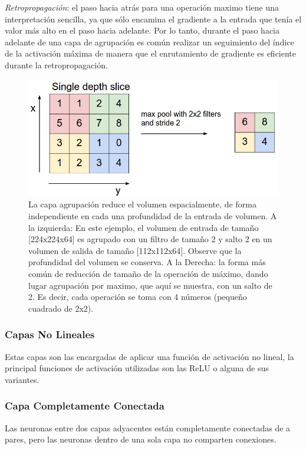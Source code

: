 \documentclass[a4paper,11pt,spanish]{book}
\begin{document}
	\emph{Retropropagación}: el paso hacia atrás para una operación maximo tiene una interpretación sencilla, ya que sólo encamina el gradiente a la entrada que tenía el valor más alto
	en el paso hacia adelante. Por lo tanto, durante el paso hacia adelante de una capa de agrupación es común realizar un seguimiento del índice de la activación máxima de
	manera que el enrutamiento de gradiente es eficiente durante la retropropagación.

	\begin{figure}[H]
	  \begin{center}
	   \includegraphics[width=0.8\linewidth]{./img/stanford_maxpool.jpeg}
	  \end{center}
	  \caption{La capa agrupación reduce el volumen espacialmente, de forma independiente en cada una profundidad de la entrada de volumen.
	    A la izquierda: En este ejemplo, el volumen de entrada de tamaño [224x224x64] es agrupado con un filtro de tamaño 2 y salto 2 en un volumen de salida de tamaño [112x112x64].
	    Observe que la profundidad del volumen se conserva. A la Derecha: la forma más común de reducción de tamaño de la operación de máximo, dando lugar agrupación por maximo,
	    que aquí se muestra, con un salto de 2. Es decir, cada operación se toma con 4 números (pequeño cuadrado de 2x2). \cite{Stanford}}
	  \label{fig:maxpool_layer}
	\end{figure}

      \subsubsection{Capas No Lineales}
	Estas capas son las encargadas de aplicar una función de activación no lineal, la principal funciones de activación utilizadas son las ReLU o alguna de sus variantes.

      \subsubsection{Capa Completamente Conectada}
	Las neuronas entre dos capas adyacentes están completamente conectadas de a pares, pero las neuronas dentro de una sola capa no comparten conexiones.
\end{document}
